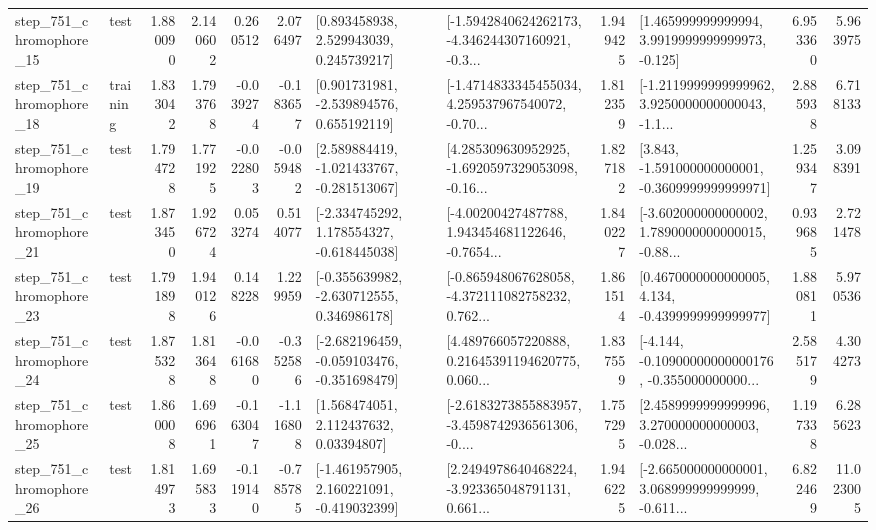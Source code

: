 \begin{tabular}{llrrrrllrlrr}
  step\_751\_chromophore\_15 &      test &      1.880090 &    2.140602 &      0.260512 &  2.076497 &     [0.893458938, 2.529943039, 0.245739217] &  [-1.5942840624262173, -4.346244307160921, -0.3... &       1.949425 &    [1.465999999999994, 3.9919999999999973, -0.125] &            6.953360 &          5.963975 \\
  step\_751\_chromophore\_18 &  training &      1.833042 &    1.793768 &     -0.039274 & -0.183657 &    [0.901731981, -2.539894576, 0.655192119] &  [-1.4714833345455034, 4.259537967540072, -0.70... &       1.812359 &  [-1.2119999999999962, 3.9250000000000043, -1.1... &            2.885938 &          6.718133 \\
  step\_751\_chromophore\_19 &      test &      1.794728 &    1.771925 &     -0.022803 & -0.059482 &   [2.589884419, -1.021433767, -0.281513067] &  [4.285309630952925, -1.6920597329053098, -0.16... &       1.827182 &   [3.843, -1.591000000000001, -0.3609999999999971] &            1.259347 &          3.098391 \\
  step\_751\_chromophore\_21 &      test &      1.873450 &    1.926724 &      0.053274 &  0.514077 &   [-2.334745292, 1.178554327, -0.618445038] &  [-4.00200427487788, 1.943454681122646, -0.7654... &       1.840227 &  [-3.602000000000002, 1.7890000000000015, -0.88... &            0.939685 &          2.721478 \\
  step\_751\_chromophore\_23 &      test &      1.791898 &    1.940126 &      0.148228 &  1.229959 &   [-0.355639982, -2.630712555, 0.346986178] &  [-0.865948067628058, -4.372111082758232, 0.762... &       1.861514 &   [0.4670000000000005, 4.134, -0.4399999999999977] &            1.880811 &          5.970536 \\
  step\_751\_chromophore\_24 &      test &      1.875328 &    1.813648 &     -0.061680 & -0.352586 &  [-2.682196459, -0.059103476, -0.351698479] &  [4.489766057220888, 0.21645391194620775, 0.060... &       1.837559 &  [-4.144, -0.10900000000000176, -0.355000000000... &            2.585179 &          4.304273 \\
  step\_751\_chromophore\_25 &      test &      1.860008 &    1.696961 &     -0.163047 & -1.116808 &      [1.568474051, 2.112437632, 0.03394807] &  [-2.6183273855883957, -3.4598742936561306, -0.... &       1.757295 &  [2.4589999999999996, 3.270000000000003, -0.028... &            1.197338 &          6.285623 \\
  step\_751\_chromophore\_26 &      test &      1.814973 &    1.695833 &     -0.119140 & -0.785785 &   [-1.461957905, 2.160221091, -0.419032399] &  [2.2494978640468224, -3.923365048791131, 0.661... &       1.946225 &  [-2.665000000000001, 3.068999999999999, -0.611... &            6.822469 &         11.023005 \\

\end{tabular}
